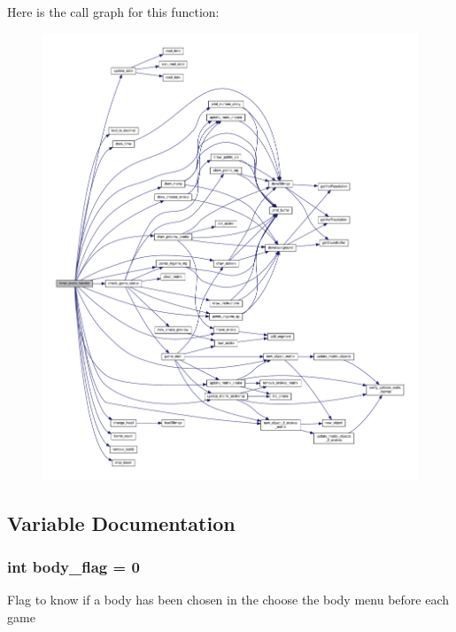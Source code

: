 Here is the call graph for this function\+:
\nopagebreak
\begin{figure}[H]
\begin{center}
\leavevmode
\includegraphics[width=350pt]{group__man__events_ga5c998385f8d5e28e1380654ad355e0b5_cgraph}
\end{center}
\end{figure}




\subsection{Variable Documentation}
\subsubsection[{\texorpdfstring{body\+\_\+flag}{body_flag}}]{\setlength{\rightskip}{0pt plus 5cm}int body\+\_\+flag = 0\hspace{0.3cm}{\ttfamily [static]}}\hypertarget{group__man__events_ga50e9227ad82eba24c0fa3bc0fa3c4c94}{}\label{group__man__events_ga50e9227ad82eba24c0fa3bc0fa3c4c94}
Flag to know if a body has been chosen in the choose the body menu before each game 
